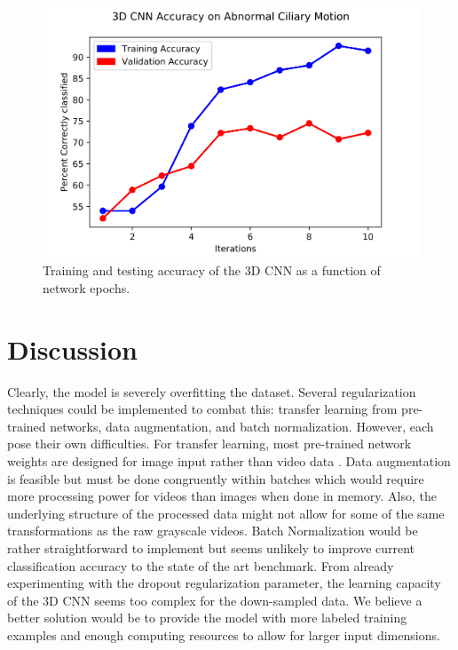 \begin{figure}
\includegraphics[scale=0.5]{CNN_graph}
\caption{Training and testing accuracy of the 3D CNN as a function of network epochs.}
\label{fig:iterations}

\end{figure}


\section{Discussion}

Clearly, the model is severely overfitting the dataset. Several regularization techniques could be implemented to combat this: transfer learning from pre-trained networks, data augmentation, and batch normalization. However, each pose their own difficulties. For transfer learning, most pre-trained network weights are designed for image input rather than video data \cite{pan2010survey}. Data augmentation is feasible but must be done congruently within batches which would require more processing power for videos than images when done in memory. Also, the underlying structure of the processed data might not allow for some of the same transformations as the raw grayscale videos. Batch Normalization \cite{ioffe2015batch} would be rather straightforward to implement but seems unlikely to improve current classification accuracy to the state of the art benchmark. From already experimenting with the dropout regularization parameter, the learning capacity of the 3D CNN seems too complex for the down-sampled data. We believe a better solution would be to provide the model with more labeled training examples and enough computing resources to allow for larger input dimensions. 
 
